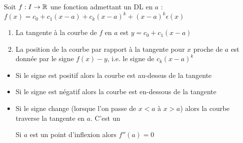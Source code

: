 \begin{frame}

\begin{proposition}
Soit $f : I \to \mathbb{R}$ une fonction admettant un DL en $a$ :
$f(x)=c_0+c_1(x-a)+c_k(x-a)^k+(x-a)^k\epsilon(x)$
\pause
\begin{enumerate}
  \item La tangente à la courbe de $f$ en $a$ est $y=c_0+c_1(x-a)$
\pause
  \item La position de la courbe par rapport à la tangente pour $x$ proche de $a$ est
donnée par le signe $f(x)-y$, i.e. le signe de $c_k(x-a)^k$
\end{enumerate}

\end{proposition}
\pause

\begin{itemize}
  \item Si le signe est positif alors la courbe est au-dessus de la tangente
\pause
  \item Si le signe est négatif alors la courbe est en-dessous de la tangente
\pause
  \item Si le signe change (lorsque l'on passe de $x<a$ à $x>a$) alors la courbe traverse 
la tangente en $a$. \pause C'est un 
\pause

Si $a$ est un point d'inflexion alors $f''(a)=0$
\end{itemize}
\end{frame}

\begin{frame}


\pause



\end{frame}


